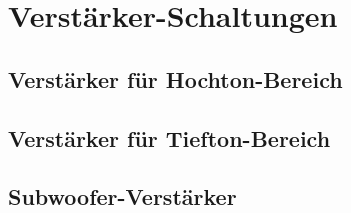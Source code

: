 \section{Verstärker-Schaltungen}


\subsection{Verstärker für Hochton-Bereich}


\subsection{Verstärker für Tiefton-Bereich}


\subsection{Subwoofer-Verstärker}